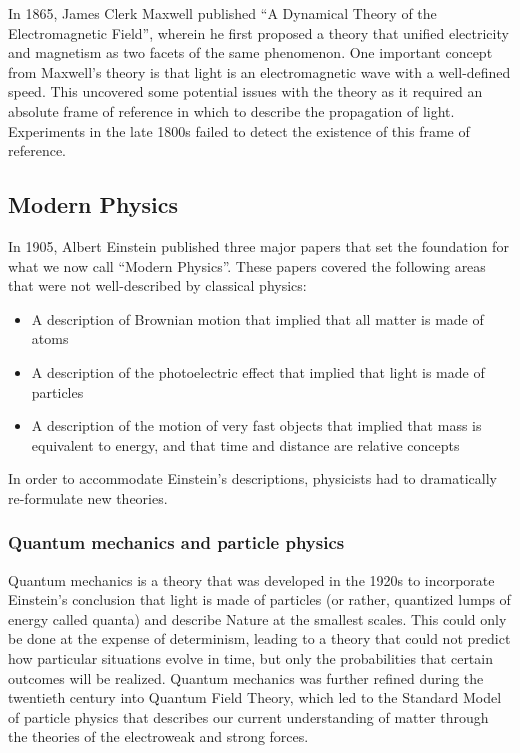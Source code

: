 In 1865, James Clerk Maxwell published ``A Dynamical Theory of the Electromagnetic Field'', wherein he first proposed a theory that unified electricity and magnetism as two facets of the same phenomenon. One important concept from Maxwell's theory is that light is an electromagnetic wave with a well-defined speed. This uncovered some potential issues with the theory as it required an absolute frame of reference in which to describe the propagation of light. Experiments in the late 1800s failed to detect the existence of this frame of reference.

\subsection{Modern Physics}
In 1905, Albert Einstein published three major papers that set the foundation for what we now call ``Modern Physics''. These papers covered the following areas that were not well-described by classical physics:
\begin{itemize}
\item A description of Brownian motion that implied that all matter is made of atoms
\item A description of the photoelectric effect that implied that light is made of particles
\item A description of the motion of very fast objects that implied that mass is equivalent to energy, and that time and distance are relative concepts
\end{itemize}
In order to accommodate Einstein's descriptions, physicists had to dramatically re-formulate new theories. 

\subsubsection{Quantum mechanics and particle physics}
Quantum mechanics is a theory that was developed in the 1920s to incorporate Einstein's conclusion that light is made of particles (or rather, quantized lumps of energy called quanta) and describe Nature at the smallest scales. This could only be done at the expense of determinism, leading to a theory that could not predict how particular situations evolve in time, but only the probabilities that certain outcomes will be realized. Quantum mechanics was further refined during the twentieth century into Quantum Field Theory, which led to the Standard Model of particle physics that describes our current understanding of matter through the theories of the electroweak and strong forces.

